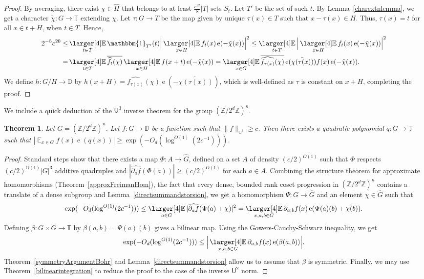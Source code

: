 \documentclass[a4paper,11pt]{article}
\newtheorem{theorem}{Theorem}
\numberwithin{theorem}{section}
\theoremstyle{definition}
\newcommand\id{\mathbbm{1}}
\newcommand{\on}[1]{
	\operatorname{#1}
}
\newcommand\ex{\mathop{\mathbb{E}}}
\newcommand{\exx}{
  \mathop{
    \mathchoice{\vcenter{\hbox{\larger[4]$\mathbb{E}$}}}
               {\kern0pt\mathbb{E}}
               {\kern0pt\mathbb{E}}
               {\kern0pt\mathbb{E}}
  }\displaylimits
}
\begin{document}
\begin{proof}
    By averaging, there exist $\chi \in \hat{H}$ that belongs to at least $\frac{c^{12}}{8}|T|$ sets $S_{t}$. Let $T'$ be the set of such $t$. By Lemma~\ref{charextnlemma}, we get a character $\tilde{\chi} : G \to \mathbb{T}$ extending $\chi$. Let $\tau : G \to T$ be the map given by unique $\tau(x) \in T$ such that $x- \tau(x) \in H$. Thus, $\tau(x) = t$ for all $x \in t + H$, when $t \in T$. Hence, 
    \begin{align*}2^{-5}c^{20} \leq &\exx_{t \in T} \id_{T'}(t) \Big|\exx_{x \in H} f_t(x) \on{e}(-\tilde{\chi}(x))\Big|^2 \leq \exx_{t \in T} \Big|\exx_{x \in H} f_t(x) \on{e}(-\tilde{\chi}(x))\Big|^2 \\
    = &\exx_{t \in T} \overline{\widehat{f_t}(\chi)} \exx_{x \in H} f(x + t) \on{e}(-\tilde{\chi}(x)) = \exx_{x \in G} \overline{\widehat{f_{\tau(x)}}(\chi)} \on{e}(\tilde{\chi(\tau(x))}) f(x) \on{e}(-\tilde{\chi}(x)).\end{align*}
    We define $h : G/ H \to \mathbb{D}$ by $h( x + H) = \widehat{f_{\tau(x)}}(\chi)  \on{e}(-\tilde{\chi(\tau(x))})$, which is well-defined as $\tau$ is constant on $x + H$, completing the proof.
\end{proof}

We include a quick deduction of the $\mathsf{U}^3$ inverse theorem for the group $(\mathbb{Z}/2^d\mathbb{Z})^n$.

\begin{theorem}\label{torsionu3powertwo}
    Let $G = (\mathbb{Z}/2^d\mathbb{Z})^n$. Let $f : G \to \mathbb{D}$ be a function such that $\|f\|_{\mathsf{U}^3} \geq c$. Then there exists a quadratic polynomial $q : G \to \mathbb{T}$ such that $|\ex_{x \in G} f(x) \on{e}(q(x))| \geq \exp(-O_d(\log^{O(1)}(2c^{-1})))$.
\end{theorem}

\begin{proof}
    Standard steps show that there exists a map $\Phi : A \to \hat{G}$, defined on a set $A$ of density $(c/2)^{O(1)}$ such that $\Phi$ respects $(c/2)^{O(1)}|G|^3$ additive quadruples and $|\widehat{\partial_af}(\Phi(a))| \geq (c/2)^{O(1)}$ for each $a \in A$. Combining the structure theorem for approximate homomorphisms (Theorem~\ref{approxFreimanHom}), the fact that every dense, bounded rank coset progression in $(\mathbb{Z}/2^d\mathbb{Z})^n$ contains a translate of a dense subgroup and Lemma~\ref{directsummandstorsion}, we get a homomorphism $\Psi : G \to \hat{G}$ and an element $\chi \in \hat{G}$ such that 
    \[\exp(-O_d(\log^{O(1)}(2c^{-1})))\leq \exx_{a \in G} |\widehat{\partial_af}(\Psi(a) + \chi)|^2 = \exx_{x,a,b \in G} \partial_{a,b}f(x) \on{e}(\Psi(a)(b) + \chi(b)).\]
    Defining $\beta  : G\times G \to \mathbb{T}$ by $\beta(a,b) = \Psi(a)(b)$ gives a bilinear map. Using the Gowers-Cauchy-Schwarz inequality, we get
    \[\exp(-O_d(\log^{O(1)}(2c^{-1})))\leq \Big|\exx_{x,a,b \in G} \partial_{a,b}f(x) \on{e}(\beta(a,b))\Big|.\]
    Theorem~\ref{symmetryArgumentBohr} and Lemma~\ref{directsummandstorsion} allow us to assume that $\beta$ is symmetric. Finally, we may use Theorem~\ref{bilinearintegration} to reduce the proof to the case of the inverse $\mathsf{U}^2$ norm.
\end{proof}
\end{document}
